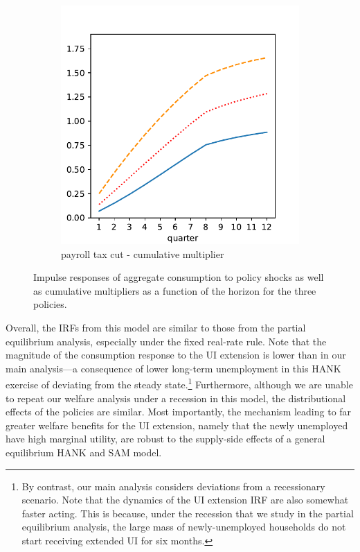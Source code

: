 \documentclass[\econtexRoot/HAFiscal]{subfiles}
\begin{document}
\begin{figure}[htb]
\begin{subfigure}[b]{.33\linewidth}
		\includegraphics[width=\linewidth]{Code/HA-Models/FromPandemicCode/Figures/HANK_tax_multiplier}
		\caption{payroll tax cut - cumulative multiplier}
		\notinsubfile{\label{fig:HANK_tax_multiplier}}
	\end{subfigure}
	\caption{Impulse responses of aggregate consumption to policy shocks as well as cumulative multipliers as a function of the horizon for the three policies.
{\label{fig:HANK_IRFs}}}
\end{figure}



Overall, the IRFs from this model are similar to those from the partial equilibrium analysis, especially under the fixed real-rate rule.
Note that the magnitude of the consumption response to the UI extension is lower than in our main analysis---a consequence of lower long-term unemployment in this HANK exercise of deviating from the steady state.\footnote{By contrast, our main analysis considers deviations from a recessionary scenario.
Note that the dynamics of the UI extension IRF are also somewhat faster acting.
This is because, under the recession that we study in the partial equilibrium analysis, the large mass of newly-unemployed households do not start receiving extended UI for six months.
} Furthermore, although we are unable to repeat our welfare analysis under a recession in this model, the distributional effects of the policies are similar.
Most importantly, the mechanism leading to far greater welfare benefits for the UI extension, namely that the newly unemployed have high marginal utility, are robust to the supply-side effects of a general equilibrium HANK and SAM model.
\end{document}
